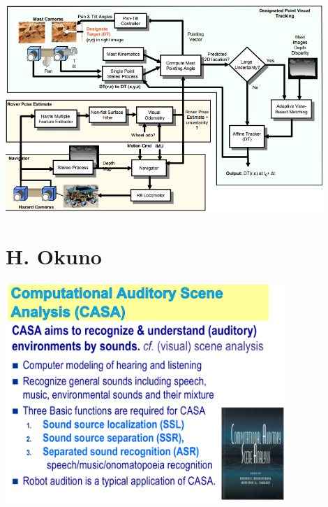 \documentclass[xetex,mathserif,serif]{beamer}
\begin{document}
	\begin{frame}
		\begin{center}
			\includegraphics[width=0.9\textwidth]{visualTracker.png}
		\end{center}
	\end{frame}

	\section{H. Okuno}

	\begin{frame}
		\begin{center}
			\includegraphics[width=0.8\textwidth]{okuno1.png}
		\end{center}
	\end{frame}
\end{document}
